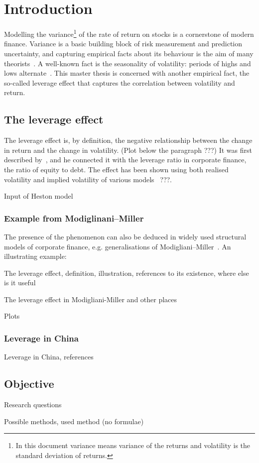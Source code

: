 \section{Introduction}

Modelling the variance\footnote{In this document variance means variance of the returns and volatility is the standard deviation of returns.} of the rate of return on stocks is a cornerstone of modern finance.
Variance is a basic building block of risk measurement and prediction uncertainty, and capturing empirical facts about its behaviour is the aim of many theorists~\citep{Christie1982}.
A well-known fact is the seasonality of volatility: periods of highs and lows alternate~\citep{schwert1989why}.
This master thesis is concerned with another empirical fact, the so-called leverage effect that captures the correlation between volatility and return.

\subsection{The leverage effect}

The leverage effect is, by definition, the negative relationship between the change in return and the change in volatility.
(Plot below the paragraph ???)
It was first described by~\citet{black1976studies}, and he connected it with the leverage ratio in corporate finance, the ratio of equity to debt.
The effect has been shown using both realised volatility and implied volatility of various models~\citep{Bouchaud2001} ???.

Input of Heston model

\subsubsection{Example from Modiglinani--Miller}

The presence of the phenomenon can also be deduced in widely used structural models of corporate finance, e.g. generalisations of Modigliani--Miller~\citep{Christie1982}.
An illustrating example:  

The leverage effect, definition, illustration, references to its existence, where else is it useful

The leverage effect in Modigliani-Miller and other places

Plots

\subsubsection{Leverage in China}

Leverage in China, references

\subsection{Objective}

Research questions

Possible methods, used method (no formulae)